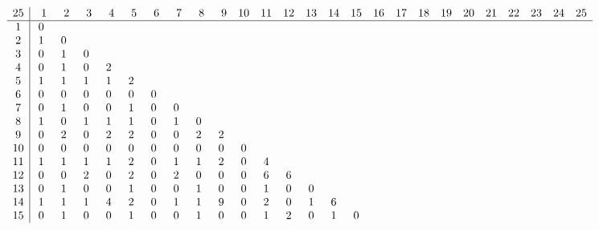 \begin{landscape}
\[
\begin{array}{c|ccccccccccccccccccccccccc}\addcontentsline{lot}{table}{\protect\numberline{}Dimensions of the Kernel of $\mathcal{L}_{r,c,25}$}
25&  \phantom{0}1&  \phantom{0}2&  \phantom{0}3&  \phantom{0}4&  \phantom{0}5&  \phantom{0}6&  \phantom{0}7&  \phantom{0}8&  \phantom{0}9& 10& 11& 12& 13& 14& 15& 16& 17& 18& 19& 20& 21& 22& 23& 24& 25\\
\hline
 1&  0&   &   &   &   &   &   &   &   &   &   &   &   &   &   &   &   &   &   &   &   &   &   &   &   \\
 2&  1&  0&   &   &   &   &   &   &   &   &   &   &   &   &   &   &   &   &   &   &   &   &   &   &   \\
 3&  0&  1&  0&   &   &   &   &   &   &   &   &   &   &   &   &   &   &   &   &   &   &   &   &   &   \\
 4&  0&  1&  0&  2&   &   &   &   &   &   &   &   &   &   &   &   &   &   &   &   &   &   &   &   &   \\
 5&  1&  1&  1&  1&  2&   &   &   &   &   &   &   &   &   &   &   &   &   &   &   &   &   &   &   &   \\
 6&  0&  0&  0&  0&  0&  0&   &   &   &   &   &   &   &   &   &   &   &   &   &   &   &   &   &   &   \\
 7&  0&  1&  0&  0&  1&  0&  0&   &   &   &   &   &   &   &   &   &   &   &   &   &   &   &   &   &   \\
 8&  1&  0&  1&  1&  1&  0&  1&  0&   &   &   &   &   &   &   &   &   &   &   &   &   &   &   &   &   \\
 9&  0&  2&  0&  2&  2&  0&  0&  2&  2&   &   &   &   &   &   &   &   &   &   &   &   &   &   &   &   \\
10&  0&  0&  0&  0&  0&  0&  0&  0&  0&  0&   &   &   &   &   &   &   &   &   &   &   &   &   &   &   \\
11&  1&  1&  1&  1&  2&  0&  1&  1&  2&  0&  4&   &   &   &   &   &   &   &   &   &   &   &   &   &   \\
12&  0&  0&  2&  0&  2&  0&  2&  0&  0&  0&  6&  6&   &   &   &   &   &   &   &   &   &   &   &   &   \\
13&  0&  1&  0&  0&  1&  0&  0&  1&  0&  0&  1&  0&  0&   &   &   &   &   &   &   &   &   &   &   &   \\
14&  1&  1&  1&  4&  2&  0&  1&  1&  9&  0&  2&  0&  1&  6&   &   &   &   &   &   &   &   &   &   &   \\
15&  0&  1&  0&  0&  1&  0&  0&  1&  0&  0&  1&  2&  0&  1&  0&   &   &   &   &   &   &   &   &   &   \\

\end{array}\]
\end{landscape}
